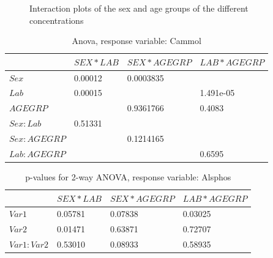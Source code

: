 \documentclass{article}
\begin{document}
\begin{figure}[H]
          \caption{Interaction plots of the sex and age groups of the different concentrations}
          \label{fig:IntAgeSex}
      \end{figure}
      

    \begin{table}
    \begin{center}
    \begin{tabular}{|l|l|l|l|}
      \hline
      &$SEX * LAB$&$SEX * AGEGRP$&$LAB*AGEGRP$\\
      \hline
      $Sex$       &0.00012&0.0003835&\\
      $Lab$       &0.00015&         &1.491e-05\\
      $AGEGRP$    &       &0.9361766&0.4083\\
      $Sex:Lab$   &0.51331&         &\\
      $Sex:AGEGRP$&       &0.1214165&\\
      $Lab:AGEGRP$&       &         &0.6595\\
      \hline
    \end{tabular}
    \caption{Anova, response variable: Cammol}
    \label{table:AnCammol}
    \end{center}
    \end{table}

    \begin{table}
    \begin{center}
    \begin{tabular}{|l|l|l|l|}
      \hline
      &$SEX * LAB$&$SEX * AGEGRP$&$LAB*AGEGRP$\\
      \hline
      $Var1$       & 0.05781 & 0.07838 & 0.03025\\
      $Var2$       & 0.01471 & 0.63871 & 0.72707\\
      $Var1:Var2$  & 0.53010 & 0.08933 & 0.58935\\
      \hline
    \end{tabular}
    \caption{p-values for 2-way ANOVA, response variable: Alsphos}
    \label{table:AnAlsphos}
    \end{center}
    \end{table}
\end{document}
